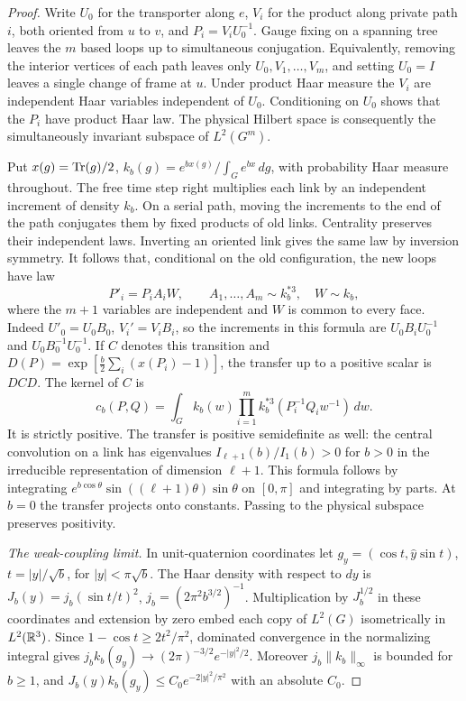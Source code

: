 \begin{proof}
Write \(U_0\) for the transporter along \(e\), \(V_i\) for the product along
private path \(i\), both oriented from \(u\) to \(v\), and \(P_i=V_iU_0^{-1}\).
Gauge fixing on a spanning tree leaves the \(m\) based loops up to
simultaneous conjugation. Equivalently, removing the interior vertices of
each path leaves only \(U_0,V_1,\ldots,V_m\), and setting \(U_0=I\)
leaves a single change of frame at \(u\). Under product Haar measure
the \(V_i\) are independent Haar variables independent of \(U_0\).
Conditioning on \(U_0\) shows that the \(P_i\) have product Haar law.
The physical Hilbert space is consequently the simultaneously invariant
subspace of \(L^2(G^m)\).

Put \(x(g)=\operatorname{Tr}(g)/2\), \(k_b(g)=e^{bx(g)}/\int_G e^{bx}\,dg\), with
probability Haar measure throughout. The free time step right multiplies
each link by an independent increment of density \(k_b\). On a serial
path, moving the increments to the end of the path conjugates them by
fixed products of old links. Centrality preserves their independent laws.
Inverting an oriented link gives the same law by inversion symmetry.
It follows that, conditional on the old configuration, the new loops have law
\[
 P'_i=P_i A_i W,\qquad
 A_1,\ldots,A_m\sim k_b^{*3},\quad W\sim k_b ,
\]
where the \(m+1\) variables are independent and \(W\) is common to every
face. Indeed \(U'_0=U_0 B_0\), \(V_i'=V_i B_i\), so the increments
in this formula are \(U_0B_iU_0^{-1}\) and \(U_0B_0^{-1}U_0^{-1}\).
If \(C\) denotes this transition and
\(D(P)=\exp[\frac b2\sum_i(x(P_i)-1)]\), the transfer up to a positive
scalar is \(DCD\). The kernel of \(C\) is
\[
 c_b(P,Q)=\int_G k_b(w)\prod_{i=1}^m
                 k_b^{*3}(P_i^{-1}Q_i w^{-1})\,dw .
\]
It is strictly positive. The transfer is positive semidefinite as well:
the central convolution on a link has eigenvalues
\(I_{\ell+1}(b)/I_1(b)>0\) for \(b>0\) in the irreducible representation
of dimension \(\ell+1\). This formula follows by integrating
\(e^{b\cos\theta}\sin((\ell+1)\theta)\sin\theta\) on \([0,\pi]\)
and integrating by parts. At \(b=0\) the transfer projects onto constants.
Passing to the physical subspace preserves positivity.

\smallskip\noindent\emph{The weak-coupling limit.}
In unit-quaternion coordinates let
\(g_y=(\cos t,\widehat y\sin t)\), \(t=|y|/\sqrt b\), for
\(|y|<\pi\sqrt b\). The Haar density with respect to \(dy\) is
\(J_b(y)=j_b(\sin t/t)^2\), \(j_b=(2\pi^2 b^{3/2})^{-1}\).
Multiplication by \(J_b^{1/2}\) in these coordinates and extension by zero
embed each copy of \(L^2(G)\) isometrically in \(L^2(\mathbb{R}^3)\).
Since \(1-\cos t\ge2t^2/\pi^2\), dominated convergence in the normalizing
integral gives \(j_b k_b(g_y)\to(2\pi)^{-3/2}e^{-|y|^2/2}\).
Moreover \(j_b\|k_b\|_\infty\) is bounded for \(b\ge1\), and
\(J_b(y)k_b(g_y)\le C_0 e^{-2|y|^2/\pi^2}\) with an absolute \(C_0\).


\end{proof}
